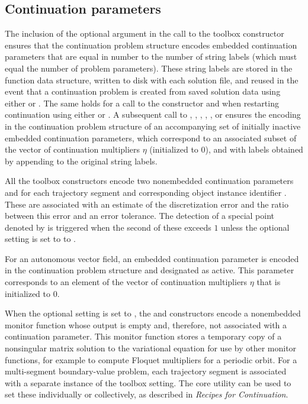 \subsection{Continuation parameters}

The inclusion of the  optional argument in the call to the  toolbox constructor ensures that the continuation problem structure encodes embedded continuation parameters that are equal in number to the number of string labels (which must equal the number of problem parameters). These string labels are stored in the function data structure, written to disk with each solution file, and reused in the event that a continuation problem is created from saved solution data using either  or . The same holds for a call to the  constructor and when restarting continuation using either  or . A subsequent call to , , , , , or  ensures the encoding in the continuation problem structure of an accompanying set of initially inactive embedded continuation parameters, which correspond to an associated subset of the vector of continuation multipliers $\eta$ (initialized to $0$), and with labels obtained by appending  to the original string labels.

All the  toolbox constructors encode two nonembedded continuation parameters  and  for each trajectory segment and corresponding object instance identifier . These are associated with an estimate of the discretization error and the ratio between this error and an error tolerance. The detection of  a special point denoted by  is triggered when the second of these exceeds $1$ unless the optional setting  is set to to .

For an autonomous vector field, an embedded continuation parameter  is encoded in the continuation problem structure and designated as active. This parameter corresponds to an element of the vector of continuation multipliers $\eta$ that is initialized to $0$.

When the optional setting  is set to , the  and  constructors encode a nonembedded monitor function whose output is empty and, therefore, not associated with a continuation parameter. This monitor function stores a temporary copy of a nonsingular matrix solution to the variational equation for use by other monitor functions, for example to compute Floquet multipliers for a periodic orbit. For a multi-segment boundary-value problem, each trajectory segment is associated with a separate instance of the  toolbox setting. The  core utility can be used to set these individually or collectively, as described in \emph{Recipes for Continuation}.

